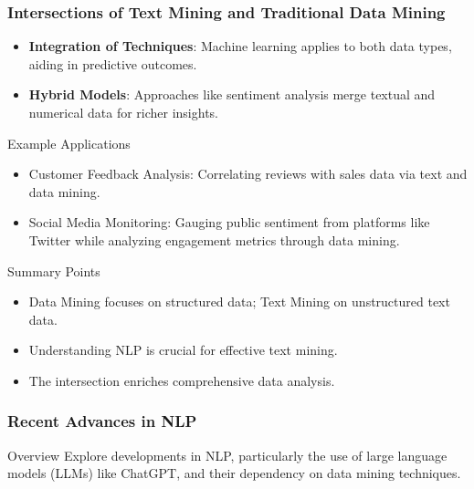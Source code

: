 \documentclass[aspectratio=169]{beamer}
\begin{document}
\begin{frame}[fragile]
    \frametitle{Intersections of Text Mining and Traditional Data Mining}
    \begin{itemize}
        \item \textbf{Integration of Techniques}: Machine learning applies to both data types, aiding in predictive outcomes.
        \item \textbf{Hybrid Models}: Approaches like sentiment analysis merge textual and numerical data for richer insights.
    \end{itemize}

    \begin{block}{Example Applications}
        \begin{itemize}
            \item Customer Feedback Analysis: Correlating reviews with sales data via text and data mining.
            \item Social Media Monitoring: Gauging public sentiment from platforms like Twitter while analyzing engagement metrics through data mining.
        \end{itemize}
    \end{block}

    \begin{block}{Summary Points}
        \begin{itemize}
            \item Data Mining focuses on structured data; Text Mining on unstructured text data.
            \item Understanding NLP is crucial for effective text mining.
            \item The intersection enriches comprehensive data analysis.
        \end{itemize}
    \end{block}

\end{frame}

\begin{frame}[fragile]
    \frametitle{Recent Advances in NLP}
    \begin{block}{Overview}
        Explore developments in NLP, particularly the use of large language models (LLMs) like ChatGPT, and their dependency on data mining techniques.
    \end{block}
\end{frame}
\end{document}
